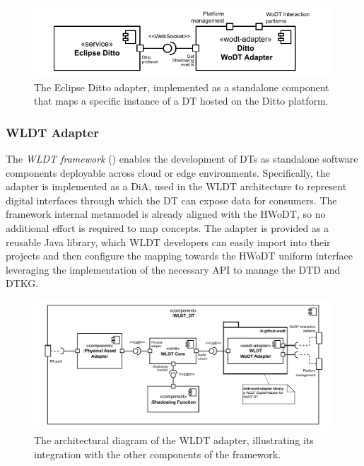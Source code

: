 \begin{figure}[ht]
  \centering
  \includegraphics[width=0.8\columnwidth]{figures/hwodt/ditto-adapter-c&c.pdf}
  \caption{The Eclipse Ditto adapter, implemented as a standalone component that maps a specific instance of a \ac{DT} hosted on the Ditto platform.}
  \label{fig:ditto-adapter-c&c}
\end{figure}

\subsubsection{\acl{WLDT} Adapter}

The \emph{\acf{WLDT} framework} () enables the development of \acp{DT} as standalone software components deployable across cloud or edge environments.
%
Specifically, the adapter is implemented as a \ac{DiA}, used in the \ac{WLDT} architecture to represent digital interfaces through which the \ac{DT} can expose data for consumers.
%
The framework internal metamodel is already aligned with the \ac{HWoDT}, so no additional effort is required to map concepts.
The adapter is provided as a reusable Java library, which \ac{WLDT} developers can easily import into their projects and then configure the mapping towards the \ac{HWoDT} uniform interface leveraging the implementation of the necessary \ac{API} to manage the \ac{DTD} and \ac{DTKG}.

\begin{figure}[ht]
  \centering
  \includegraphics[width=\textwidth]{figures/hwodt/wldt-adapter-c&c.pdf}
  \caption{The architectural diagram of the \ac{WLDT} adapter, illustrating its integration with the other components of the framework.}
  \label{fig:wldt-adapter-c&c}
\end{figure}


